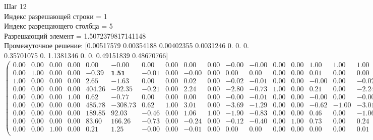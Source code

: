 \documentclass{article}
\begin{document}
\begin{flushleft}
    Шаг 12\\
Индекс разрешающей строки = 1\\
Индекс разрещающего столбца = 5\\
Разрешающий элемент = 1.5072379817141148\\
Промежуточное решение:
 [0.00517579 0.00354188 0.00402355 0.0031246  0.         0.
 0.         0.35701075 0.         1.1381346  0.         0.
 0.49151839 0.48670766]
\begin{equation*}
\begin{pmatrix}
 0.00 & 0.00 & 0.00 & 0.00 &   0.00 &   -0.00 &  0.00 & 0.00 &  0.00 & 0.00 & -0.00 & -0.00 & 0.00 & 0.00 &  1.00 &  1.00 &  1.00 &  1.00 &  1.00 &  1.00 &  1.00 &  1.00 & -0.00 \\
 0.00 & 1.00 & 0.00 & 0.00 &  -0.39 &    \textbf{1.51} & -0.01 & 0.00 & -0.00 & 0.00 &  0.00 &  0.00 & 0.00 & 0.00 &  0.01 &  0.00 &  0.00 &  0.00 & -0.00 & -0.00 &  0.00 &  0.00 &  0.00 \\
 1.00 & 0.00 & 0.00 & 0.00 &   2.65 &   -1.63 &  0.00 & 0.00 &  0.02 & 0.00 & -0.02 & -0.01 & 0.00 & 0.00 & -0.00 &  0.00 & -0.02 &  0.00 &  0.02 &  0.01 &  0.00 &  0.00 &  0.01 \\
 0.00 & 0.00 & 0.00 & 0.00 & 404.26 &  -92.35 & -0.21 & 0.00 &  2.24 & 0.00 & -2.80 & -0.73 & 1.00 & 0.00 &  0.21 &  0.00 & -2.24 &  0.00 &  2.80 &  0.73 & -1.00 &  0.00 &  0.49 \\
 0.00 & 0.00 & 0.00 & 1.00 &   0.62 &   -0.77 &  0.00 & 0.00 &  0.00 & 0.00 & -0.00 & -0.01 & 0.00 & 0.00 & -0.00 &  0.00 & -0.00 &  0.00 &  0.00 &  0.01 &  0.00 &  0.00 &  0.00 \\
 0.00 & 0.00 & 0.00 & 0.00 & 485.78 & -308.73 &  0.62 & 1.00 &  3.01 & 0.00 & -3.69 & -1.29 & 0.00 & 0.00 & -0.62 & -1.00 & -3.01 &  0.00 &  3.69 &  1.29 &  0.00 &  0.00 &  0.36 \\
 0.00 & 0.00 & 0.00 & 0.00 & 189.85 &   92.03 & -0.46 & 0.00 &  1.06 & 1.00 & -1.90 & -0.83 & 0.00 & 0.00 &  0.46 &  0.00 & -1.06 & -1.00 &  1.90 &  0.83 &  0.00 &  0.00 &  1.14 \\
 0.00 & 0.00 & 0.00 & 0.00 &  83.60 &  166.26 & -0.73 & 0.00 & -0.24 & 0.00 & -0.12 & -0.40 & 0.00 & 1.00 &  0.73 &  0.00 &  0.24 &  0.00 &  0.12 &  0.40 &  0.00 & -1.00 &  0.49 \\
 0.00 & 0.00 & 1.00 & 0.00 &   0.21 &    1.25 & -0.00 & 0.00 & -0.01 & 0.00 &  0.00 &  0.00 & 0.00 & 0.00 &  0.00 &  0.00 &  0.01 &  0.00 & -0.00 & -0.00 &  0.00 &  0.00 &  0.00 \\
\end{pmatrix}
\end{equation*}
\end{flushleft}
\end{document}
